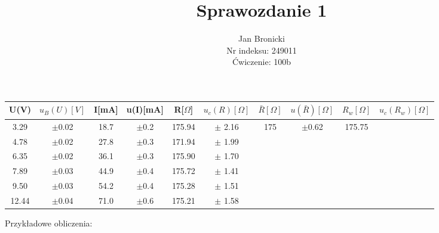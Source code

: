 \documentclass{article}
\title{Sprawozdanie 1}
\author{Jan Bronicki \\
Nr indeksu: 249011\\
Ćwiczenie: 100b}
\date{}
\begin{document}
\maketitle

%

\begin{center}
    \renewcommand{\arraystretch}{1.3}
\begin{tabular}{ |c|c|c|c|c|c|c|c|c|c| }
    \hline
    U(V)&$u_B (U)[V]$&I[mA]&u(I)[mA]&R[$\Omega$]&$u_c(R)[\Omega]$&$\bar{R}[\Omega]$&$u(\bar{R})[\Omega]$&$R_w[\Omega]$&$u_c(R_w)[\Omega]$ \\
    \hline \hline
    3.29&$\pm$0.02&18.7&$\pm$0.2&175.94&$\pm$ 2.16& \multirow{6}{*}{175}&\multirow{6}{*}{$\pm$0.62}&\multirow{6}{*}{175.75}&\\ 
    \cline{1-6}

    4.78&$\pm$0.02&27.8&$\pm$0.3&171.94&$\pm$ 1.99&&&&\\ 
    \cline{1-6}
  
    6.35&$\pm$0.02&36.1&$\pm$0.3&175.90&$\pm$ 1.70&&&&\\ 
    \cline{1-6}

    7.89&$\pm$0.03&44.9&$\pm$0.4&175.72&$\pm$ 1.41&&&&\\ 
    \cline{1-6}

    9.50&$\pm$0.03&54.2&$\pm$0.4&175.28&$\pm$ 1.51&&&&\\ 
    \cline{1-6}
    
    12.44&$\pm$0.04&71.0&$\pm$0.6&175.21&$\pm$ 1.58&&&&\\ 
    \hline
\end{tabular}
\label{tabular: t}
\end{center}
Przykładowe obliczenia:
\end{document}
